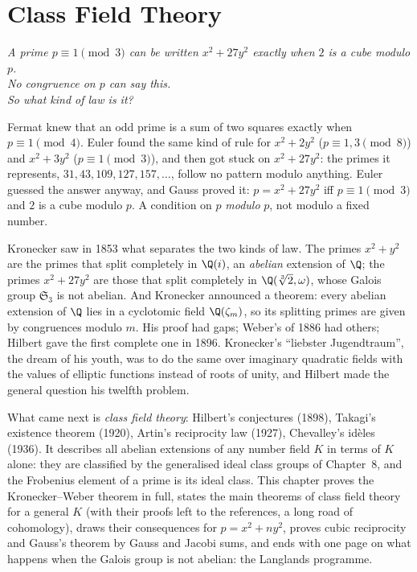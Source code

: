 \chapter{Class Field Theory}
\begin{center}\itshape
A prime $p\equiv1\pmod 3$ can be written $x^2+27y^2$ exactly when $2$ is a cube modulo $p$.\\
No congruence on $p$ can say this.\\
So what kind of law is it?
\end{center}

Fermat knew that an odd prime is a sum of two squares exactly when $p\equiv1\pmod4$. Euler found the same kind of rule for
$x^2+2y^2$ ($p\equiv1,3\pmod8$) and $x^2+3y^2$ ($p\equiv1\pmod3$), and then got stuck on $x^2+27y^2$: the primes it represents,
$31,43,109,127,157,\dots$, follow no pattern modulo anything. Euler guessed the answer anyway, and Gauss proved it: $p=x^2+27y^2$
iff $p\equiv1\pmod3$ and $2$ is a cube modulo $p$. A condition on $p$ \emph{modulo} $p$, not modulo a fixed number.

Kronecker saw in 1853 what separates the two kinds of law. The primes $x^2+y^2$ are the primes that split completely in $\Q(i)$, an
\emph{abelian} extension of $\Q$; the primes $x^2+27y^2$ are those that split completely in $\Q(\sqrt[3]2,\omega)$, whose Galois group
$\mathfrak S_3$ is not abelian. And Kronecker announced a theorem: every abelian extension of $\Q$ lies in a cyclotomic field
$\Q(\zeta_m)$, so its splitting primes are given by congruences modulo $m$. His proof had gaps; Weber's of 1886 had others; Hilbert
gave the first complete one in 1896. Kronecker's ``liebster Jugendtraum'', the dream of his youth, was to do the same over imaginary
quadratic fields with the values of elliptic functions instead of roots of unity, and Hilbert made the general question his
twelfth problem.

What came next is \emph{class field theory}: Hilbert's conjectures (1898), Takagi's existence theorem (1920), Artin's reciprocity law
(1927), Chevalley's id\`eles (1936). It describes all abelian extensions of any number field $K$ in terms of $K$ alone: they are
classified by the generalised ideal class groups of Chapter~8, and the Frobenius element of a prime is its ideal class. This chapter
proves the Kronecker--Weber theorem in full, states the main theorems of class field theory for a general $K$ (with their proofs left
to the references, a long road of cohomology), draws their consequences for $p=x^2+ny^2$, proves cubic reciprocity and Gauss's theorem
by Gauss and Jacobi sums, and ends with one page on what happens when the Galois group is not abelian: the Langlands programme.

